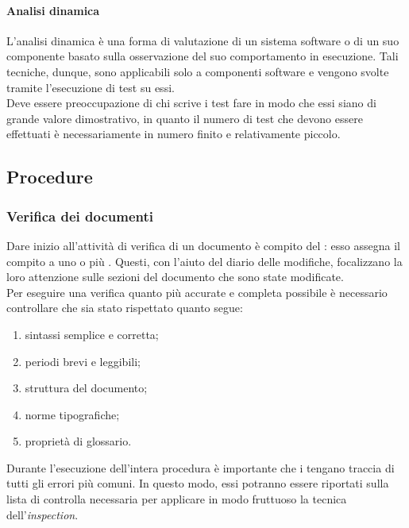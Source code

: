 			\paragraph{Analisi dinamica}
				L'analisi dinamica è una forma di valutazione di un sistema software o di un suo componente basato sulla osservazione del suo comportamento in esecuzione. Tali tecniche, dunque, sono applicabili solo a componenti software e vengono svolte tramite l'esecuzione di test su essi.\\
				Deve essere preoccupazione di chi scrive i test fare in modo che essi siano di grande valore dimostrativo, in quanto il numero di test che devono essere effettuati è necessariamente in numero finito e relativamente piccolo.
	\subsection{Procedure}
		\subsubsection{Verifica dei documenti}
			Dare inizio all'attività di verifica di un documento è compito del : esso assegna il compito a uno o più . 
			Questi, con l'aiuto del diario delle modifiche, focalizzano la loro attenzione sulle sezioni del documento che sono state modificate.\\
			Per eseguire una verifica quanto più accurate e completa possibile è necessario controllare che sia stato rispettato quanto segue:
			\begin{enumerate}
				\item sintassi semplice e corretta;
				\item periodi brevi e leggibili;
				\item struttura del documento;
				\item norme tipografiche;
				\item proprietà di glossario.
			\end{enumerate}
			Durante l'esecuzione dell'intera procedura è importante che i  tengano traccia di tutti gli errori più comuni. In questo modo, 
			essi potranno essere riportati sulla lista di controlla necessaria per applicare in modo fruttuoso la tecnica dell'\textit{inspection}.

